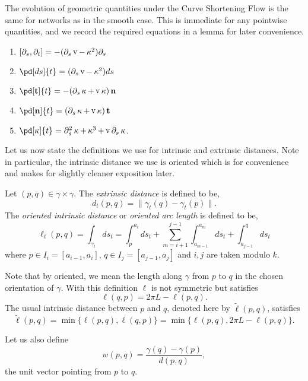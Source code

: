 \documentclass[11pt]{amsart}
\DeclareMathOperator{\tangspeed}{v}
\begin{document}
The evolution of geometric quantities under the Curve Shortening Flow is the same for networks as in the smooth case. This is immediate for any pointwise quantities, and we record the required equations in a lemma for later convenience.

\begin{lemma}
\label{lem:basic_evolution}
\begin{enumerate}
\item \([\partial_s, \partial_t] = -(\partial_s \tangspeed - \curvecurv^2) \partial_s\)
\item \(\pd[ds]{t} = (\partial_s \tangspeed - \curvecurv^2) ds\)
\item \(\pd[\tang]{t} = -(\partial_s \curvecurv + \tangspeed\curvecurv) \nor\)
\item \(\pd[\nor]{t} = (\partial_s \curvecurv + \tangspeed\curvecurv) \tang\)
\item \(\pd[\curvecurv]{t} = \partial_s^2 \curvecurv + \curvecurv^3 + \tangspeed \partial_s \curvecurv\).
\end{enumerate}
\end{lemma}

Let us now state the definitions we use for intrinsic and extrinsic distances. Note in particular, the intrinsic distance we use is oriented which is for convenience and makes for slightly cleaner exposition later.

\begin{defn}
Let \((p,q) \in \gamma \times \gamma\). The \emph{extrinsic distance} is defined to be,
\[
d_t(p, q) = \|\gamma_t(q) - \gamma_t(p)\|.
\]
The \emph{oriented intrinsic distance} or \emph{oriented arc length} is defined to be,
\[
\ell_t(p, q) = \int_{\gamma_t} ds_t = \int_p^{a_i} ds_t + \sum_{m=i+1}^{j-1} \int_{a_{m-1}}^{a_m} ds_t + \int_{a_{j-1}}^q ds_t
\]
where \(p \in I_i = [a_{i-1}, a_i]\), \(q \in I_j = [a_{j-1}, a_j]\) and \(i,j\) are taken modulo \(k\).
\end{defn}

Note that by oriented, we mean the length along \(\gamma\) from \(p\) to \(q\) in the chosen orientation of \(\gamma\). With this definition \(\ell\) is not symmetric but satisfies
\[
\ell(q, p) = 2\pi L - \ell(p, q).
\]
The usual intrinsic distance between \(p\) and \(q\), denoted here by \(\tilde{\ell}(p, q)\), satisfies
\[
\tilde{\ell}(p, q) = \min\{\ell(p, q), \ell(q, p)\} = \min\{\ell(p, q), 2\pi L - \ell(p, q)\}.
\]

Let us also define
\[
w(p, q) = \frac{\gamma(q) - \gamma(p)}{d(p,q)},
\]
the unit vector pointing from \(p\) to \(q\).
\end{document}
